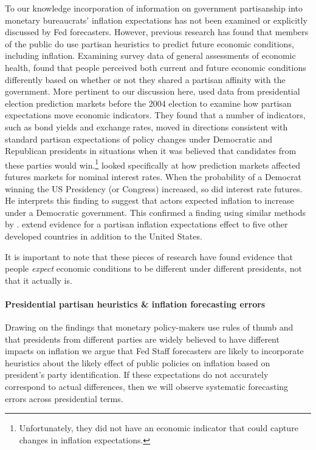 \documentclass[a4paper]{article}
\begin{document}
To our knowledge incorporation of information on government partisanship into monetary bureaucrats' inflation expectations has not been examined or explicitly discussed by Fed forecasters. However, previous research has found that members of the public do use partisan heuristics to predict future economic conditions, including inflation. Examining survey data of general assessments of economic health, \cite{Duch2000} found that people perceived both current and future economic conditions differently based on whether or not they shared a partisan affinity with the government. More pertinent to our discussion here, \cite{Snowberg2007} used data from presidential election prediction markets before the 2004 election to examine how partisan expectations move economic indicators. They found that a number of indicators, such as bond yields and exchange rates, moved in directions consistent with standard partisan expectations of policy changes under Democratic and Republican presidents in situations when it was believed that candidates from these parties would win.\footnote{Unfortunately, they did not have an economic indicator that could capture changes in inflation expectations.} \cite{Fowler2006} looked specifically at how prediction markets affected futures markets for nominal interest rates. When the probability of a Democrat winning the US Presidency (or Congress) increased, so did interest rate futures. He interprets this finding to suggest that actors expected inflation to increase under a Democratic government. This confirmed a finding using similar methods by \cite{Alesina1997}. \cite{Berlemann2006} extend evidence for a partisan inflation expectations effect to five other developed countries in addition to the United States.

It is important to  note that these pieces of research have found evidence that people {\emph{expect}} economic conditions to be different under different presidents, not that it actually is.

\paragraph{Presidential partisan heuristics \& inflation forecasting errors}

Drawing on the findings that monetary policy-makers use rules of thumb and that presidents from different parties are widely believed to have different impacts on inflation we argue that Fed Staff forecasters are likely to incorporate heuristics about the likely effect of public policies on inflation based on president's party identification. If these expectations do not accurately correspond to actual differences, then we will observe systematic forecasting errors across presidential terms.  
\end{document}
